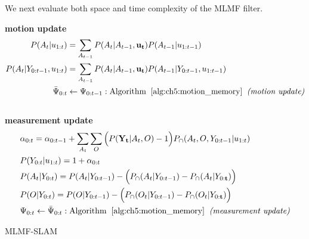 We next evaluate both space and time complexity of the MLMF filter.

\newpage
\begin{center}
\begin{minipage}{\linewidth}
\begin{algorithm}[H]
\label{alg:mrf-slam}
\nonl\hrulefill	
\BlankLine
\nonl\textbf{motion update}\\
\nonl\begin{align}
P(A_t|u_{1:t})  	 &= \sum\limits_{A_{t-1}} P(A_t|A_{t-1},\mathbf{u_t})  P(A_{t-1}|u_{1:t-1}) \nonumber \\
P(A_t|Y_{0:t-1},u_{1:t}) &= \sum\limits_{A_{t-1}} P(A_t|A_{t-1},\mathbf{u_t})  P(A_{t-1}|Y_{0:t-1},u_{1:t-1}) \nonumber \\
\bar{\Psi}_{0:t} 	 &\gets \Psi_{0:t-1}: \mathrm{ Algorithm\;\; \ref{alg:ch5:motion_memory}\;\; \textit{(motion update)}} \nonumber
\end{align}
\BlankLine
\nonl\hrulefill	\\
\nonl\textbf{measurement update}
\nonl\begin{align}
 &\alpha_{0:t}       = \alpha_{0:t-1} + \sum\limits_{A_t}\sum\limits_{O} \Big(P(\mathbf{Y_t}|A_t,O) - 1\Big)P_{\cap}(A_t,O,Y_{0:t-1}|u_{1:t}) \nonumber \\
 &P(Y_{0:t}|u_{1:t}) = 1 + \alpha_{0:t} \nonumber\\
 &P(A_t|Y_{0:t})     = P(A_t|Y_{0:t-1}) - \Big(P_{\cap}(A_t|Y_{0:t-1}) -  P_{\cap}(A_t|Y_{0:\mathbf{t}}) \Big) \nonumber \\
 &P(O|Y_{0:t})       = P(O|Y_{0:t-1}) -  \Big(  P_{\cap}(O_t|Y_{0:t-1}) -  P_{\cap}(O_t|Y_{0:\mathbf{t}})\Big) \nonumber \\    
 &\Psi_{0:t} \gets \bar{\Psi}_{0:t}: \mathrm{Algorithm\;\; \ref{alg:ch5:motion_memory}\;\; \textit{(measurement update)}} \nonumber
 \end{align}
\caption{MLMF-SLAM}
\end{algorithm} 
\end{minipage}
\end{center}
\newpage


